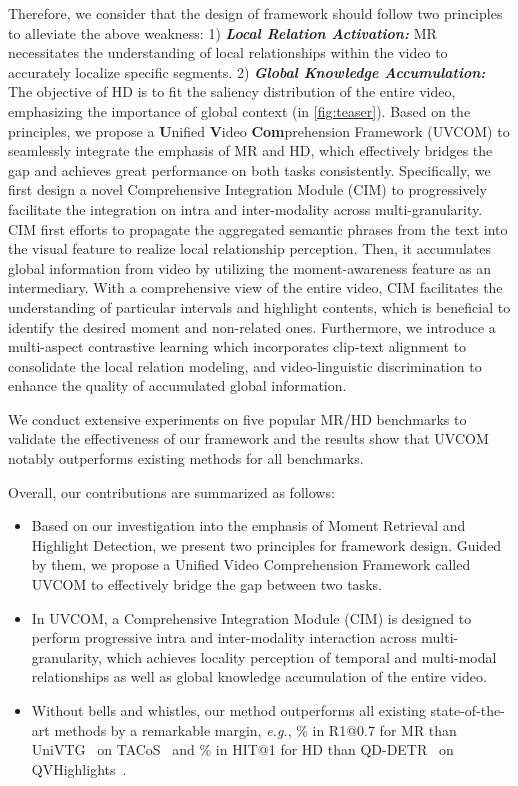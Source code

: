 \documentclass[10pt,twocolumn,letterpaper]{article}
\begin{document}
Therefore, we consider that the design of framework should follow two principles to alleviate the above weakness: 1) \textit{\textbf{Local Relation Activation:}} MR necessitates the understanding of local relationships within the video to accurately localize specific segments. 2) \textit{\textbf{Global Knowledge Accumulation:}} The objective of HD is to fit the saliency distribution of the entire video, emphasizing the importance of global context (in \cref{fig:teaser}). Based on the principles, we propose a \textbf{U}nified \textbf{V}ideo \textbf{Com}prehension Framework (UVCOM) to seamlessly integrate the emphasis of MR and HD, which effectively bridges the gap and achieves great performance on both tasks consistently. 
Specifically, we first design a novel Comprehensive Integration Module (CIM) to progressively facilitate the integration on intra and inter-modality across multi-granularity.
CIM first efforts to propagate the aggregated semantic phrases from the text into the visual feature to realize local relationship perception.
Then, it accumulates global information from video by utilizing the moment-awareness feature as an intermediary.
With a comprehensive view of the entire video, CIM facilitates the understanding of particular intervals and highlight contents, which is beneficial to identify the desired moment and non-related ones. 
Furthermore, we introduce a multi-aspect contrastive learning which incorporates clip-text alignment to consolidate the local relation modeling, and video-linguistic discrimination to enhance the quality of accumulated global information.

We conduct extensive experiments on five popular MR/HD benchmarks  
to validate the effectiveness of our framework and the results show that UVCOM notably outperforms existing methods for all benchmarks.

Overall, our contributions are summarized as follows:
\begin{itemize}
    \item Based on our investigation into the emphasis of Moment Retrieval and Highlight Detection, we present two principles for framework design. Guided by them, we propose a Unified Video Comprehension Framework called UVCOM to effectively bridge the gap between two tasks.
    \item In UVCOM, a Comprehensive Integration Module (CIM) is designed to perform progressive intra and inter-modality interaction across multi-granularity, which achieves locality perception of temporal and multi-modal relationships as well as global knowledge accumulation of the entire video.
    \item Without bells and whistles, our method outperforms all existing state-of-the-art methods by a remarkable margin, \textit{e.g.}, \% in R1@0.7 for MR than UniVTG~\cite{univtg} on TACoS~\cite{tacos} and \% in HIT@1 for HD than QD-DETR~\cite{qddetr} on QVHighlights~\cite{momentdetr}.
\end{itemize}
\end{document}
